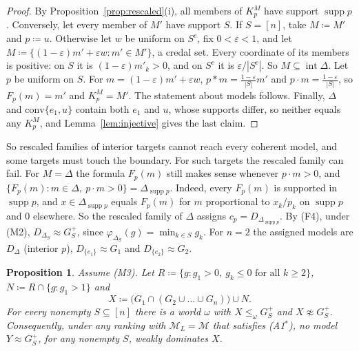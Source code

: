 \documentclass[11pt]{article}
\newtheorem{proposition}[theorem]{Proposition}
\theoremstyle{definition}
\newcommand{\supp}{\operatorname{supp}}
\newcommand{\Mc}{\mathcal M}
\begin{document}
\begin{proof}
By Proposition~\ref{prop:rescaled}(i), all members of $K^M_p$ have support $\supp p$. Conversely, let every member of $M'$ have support $S$. If $S=[n]$, take $M\coloneqq M'$ and $p\coloneqq u$. Otherwise let $w$ be uniform on $S^c$, fix $0<\varepsilon<1$, and let $M\coloneqq\{(1-\varepsilon)m'+\varepsilon w:m'\in M'\}$, a credal set. Every coordinate of its members is positive: on $S$ it is $(1-\varepsilon)m'_k>0$, and on $S^c$ it is $\varepsilon/|S^c|$. So $M\subseteq\operatorname{int}\Delta$. Let $p$ be uniform on $S$. For $m=(1-\varepsilon)m'+\varepsilon w$, $p*m=\frac{1-\varepsilon}{|S|}m'$ and $p\cdot m=\frac{1-\varepsilon}{|S|}$, so $F_p(m)=m'$ and $K^M_p=M'$. The statement about models follows. Finally, $\Delta$ and $\mathrm{conv}\{e_1,u\}$ contain both $e_1$ and $u$, whose supports differ, so neither equals any $K^M_p$, and Lemma~\ref{lem:injective} gives the last claim.
\end{proof}

So rescaled families of interior targets cannot reach every coherent model, and some targets must touch the boundary. For such targets the rescaled family can fail. For $M=\Delta$ the formula $F_p(m)$ still makes sense whenever $p\cdot m>0$, and $\{F_p(m):m\in\Delta,\ p\cdot m>0\}=\Delta_{\supp p}$. Indeed, every $F_p(m)$ is supported in $\supp p$, and $x\in\Delta_{\supp p}$ equals $F_p(m)$ for $m$ proportional to $x_k/p_k$ on $\supp p$ and $0$ elsewhere. So the rescaled family of $\Delta$ assigns $c_p=D_{\Delta_{\supp p}}$. By (F4), under (M2), $D_{\Delta_S}\approx G_S^+$, since $\varphi_{\Delta_S}(g)=\min_{k\in S}g_k$. For $n=2$ the assigned models are $D_\Delta$ (interior $p$), $D_{\{e_1\}}\approx G_1$ and $D_{\{e_2\}}\approx G_2$.

\begin{proposition}\label{prop:obstruction}
Assume (M3). Let $R\coloneqq\{g:g_1>0,\ g_k\le0\text{ for all }k\ge2\}$, $N\coloneqq R\cap\{g:g_1>1\}$ and
\[
X\coloneqq\big(G_1\cap(G_2\cup\dots\cup G_n)\big)\cup N .
\]
For every nonempty $S\subseteq[n]$ there is a world $\omega$ with $X\le_\omega G_S^+$ and $X\not\approx G_S^+$. Consequently, under any ranking with $\Mc_L=\Mc$ that satisfies (A1$^*$), no model $Y\approx G_S^+$, for any nonempty $S$, weakly dominates $X$.
\end{proposition}
\end{document}
